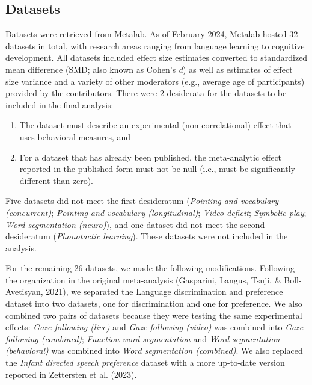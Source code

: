 \documentclass[
  man]{apa6}
\providecommand{\tightlist}{%
  \setlength{\itemsep}{0pt}\setlength{\parskip}{0pt}}
\begin{document}
\begin{table*}[hbt]
\begin{center}
\begin{threeparttable}
\end{threeparttable}
\end{center}

\end{table*}
\efloatseparator

\hypertarget{datasets}{%
\subsection{Datasets}\label{datasets}}

Datasets were retrieved from Metalab. As of February 2024, Metalab hosted 32 datasets in total, with research areas ranging from language learning to cognitive development. All datasets included effect size estimates converted to standardized mean difference (SMD; also known as Cohen's \emph{d}) as well as estimates of effect size variance and a variety of other moderators (e.g., average age of participants) provided by the contributors. There were 2 desiderata for the datasets to be included in the final analysis:

\begin{enumerate}
\def\labelenumi{\arabic{enumi}.}
\tightlist
\item
  The dataset must describe an experimental (non-correlational) effect that uses behavioral measures, and
\item
  For a dataset that has already been published, the meta-analytic effect reported in the published form must not be null (i.e., must be significantly different than zero).
\end{enumerate}

Five datasets did not meet the first desideratum (\emph{Pointing and vocabulary (concurrent)}; \emph{Pointing and vocabulary (longitudinal)}; \emph{Video deficit}; \emph{Symbolic play}; \emph{Word segmentation (neuro)}), and one dataset did not meet the second desideratum (\emph{Phonotactic learning}). These datasets were not included in the analysis.

For the remaining 26 datasets, we made the following modifications. Following the organization in the original meta-analysis (Gasparini, Langus, Tsuji, \& Boll-Avetisyan, 2021), we separated the Language discrimination and preference dataset into two datasets, one for discrimination and one for preference. We also combined two pairs of datasets because they were testing the same experimental effects: \emph{Gaze following (live)} and \emph{Gaze following (video)} was combined into \emph{Gaze following (combined)}; \emph{Function word segmentation} and \emph{Word segmentation (behavioral)} was combined into \emph{Word segmentation (combined)}. We also replaced the \emph{Infant directed speech preference} dataset with a more up-to-date version reported in Zettersten et al. (2023).
\end{document}
